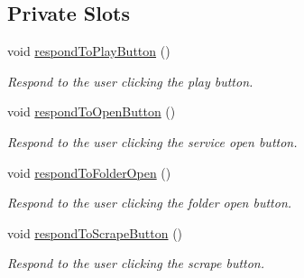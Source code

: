 \subsection*{Private Slots}
\begin{DoxyCompactItemize}
\item 
\hypertarget{class_u_i_1_1_info_pane_a3dde366065f2cf1ba89d1170b9dc20ee}{void \hyperlink{class_u_i_1_1_info_pane_a3dde366065f2cf1ba89d1170b9dc20ee}{respond\-To\-Play\-Button} ()}\label{class_u_i_1_1_info_pane_a3dde366065f2cf1ba89d1170b9dc20ee}

\begin{DoxyCompactList}\small\item\em Respond to the user clicking the play button. \end{DoxyCompactList}\item 
\hypertarget{class_u_i_1_1_info_pane_a7f73f9901e9719e6c5b470a9bda29f3d}{void \hyperlink{class_u_i_1_1_info_pane_a7f73f9901e9719e6c5b470a9bda29f3d}{respond\-To\-Open\-Button} ()}\label{class_u_i_1_1_info_pane_a7f73f9901e9719e6c5b470a9bda29f3d}

\begin{DoxyCompactList}\small\item\em Respond to the user clicking the service open button. \end{DoxyCompactList}\item 
\hypertarget{class_u_i_1_1_info_pane_af1f09bf53769baba5ff2191d72aaa52b}{void \hyperlink{class_u_i_1_1_info_pane_af1f09bf53769baba5ff2191d72aaa52b}{respond\-To\-Folder\-Open} ()}\label{class_u_i_1_1_info_pane_af1f09bf53769baba5ff2191d72aaa52b}

\begin{DoxyCompactList}\small\item\em Respond to the user clicking the folder open button. \end{DoxyCompactList}\item 
\hypertarget{class_u_i_1_1_info_pane_a1aa42e34d9ed7d4ba4ac49f1685bfb32}{void \hyperlink{class_u_i_1_1_info_pane_a1aa42e34d9ed7d4ba4ac49f1685bfb32}{respond\-To\-Scrape\-Button} ()}\label{class_u_i_1_1_info_pane_a1aa42e34d9ed7d4ba4ac49f1685bfb32}

\begin{DoxyCompactList}\small\item\em Respond to the user clicking the scrape button. \end{DoxyCompactList}\end{DoxyCompactItemize}
